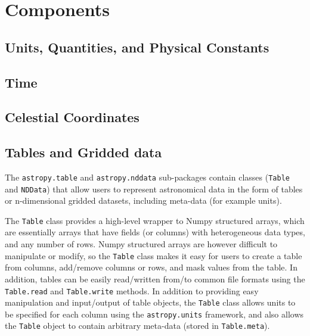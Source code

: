 \documentclass[12pt,preprint]{aastex}
\begin{document}


\section{Components}


\subsection{Units, Quantities, and Physical Constants}



\subsection{Time}



\subsection{Celestial Coordinates}



\subsection{Tables and Gridded data}


The \texttt{astropy.table} and \texttt{astropy.nddata} sub-packages contain
classes (\texttt{Table} and \texttt{NDData}) that allow users to represent
astronomical data in the form of tables or n-dimensional gridded datasets,
including meta-data (for example units).

The \texttt{Table} class provides a high-level wrapper to Numpy structured
arrays, which are essentially arrays that have fields (or columns) with
heterogeneous data types, and any number of rows. Numpy structured arrays are
however difficult to manipulate or modify, so the \texttt{Table} class makes
it easy for users to create a table from columns, add/remove columns or rows,
and mask values from the table. In addition, tables can be easily read/written
from/to common file formats using the \texttt{Table.read} and
\texttt{Table.write} methods. In addition to providing easy manipulation and
input/output of table objects, the \texttt{Table} class allows units to be
specified for each column using the \texttt{astropy.units} framework, and also
allows the \texttt{Table} object to contain arbitrary meta-data (stored in
\texttt{Table.meta}).
\end{document}
